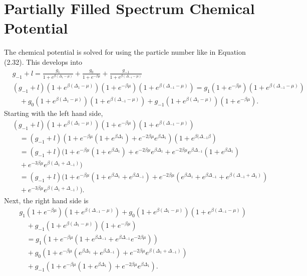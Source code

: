 \section{Partially Filled Spectrum Chemical Potential}
The chemical potential is solved for using the particle number like in Equation (2.32). This develops into  
\begin{align}
    &g_{-1}+l=\frac{g_1}{1+e^{\beta(\Delta_1-\mu)}}+\frac{g_0}{1+e^{-\beta\mu}}+\frac{g_{-1}}{1+e^{\beta(\Delta_{-1}-\mu)}}\\
    &(g_{-1}+l)(1+e^{\beta(\Delta_1-\mu)})(1+e^{-\beta\mu})(1+e^{\beta(\Delta_{-1}-\mu)})=g_1(1+e^{-\beta\mu})(1+e^{\beta(\Delta_{-1}-\mu)})\nonumber\\
    &\quad+g_0(1+e^{\beta(\Delta_1-\mu)})(1+e^{\beta(\Delta_{-1}-\mu)})+g_{-1}(1+e^{\beta(\Delta_1-\mu)})(1+e^{-\beta\mu}).
    \end{align}
Starting with the left hand side,
\begin{align}
    &(g_{-1}+l)(1+e^{\beta(\Delta_1-\mu)})(1+e^{-\beta\mu})(1+e^{\beta(\Delta_{-1}-\mu)})\nonumber\\
    &\quad=(g_{-1}+l)(1+e^{-\beta\mu}(1+e^{\beta\Delta_1})+e^{-2\beta\mu}e^{\beta\Delta_1})(1+e^{\beta(\Delta_{-1}\beta})\nonumber\\
    &\quad=(g_{-1}+l)(1+e^{-\beta\mu}(1+e^{\beta\Delta_1})+e^{-2\beta\mu}e^{\beta\Delta_1}+e^{-2\beta\mu}e^{\beta\Delta_{-1}}(1+e^{\beta\Delta_1})\nonumber\\
    &\quad+e^{-3\beta\mu}e^{\beta(\Delta_1+\Delta_{-1})})\nonumber\\
    &\quad=(g_{-1}+l)(1+e^{-\beta\mu}(1+e^{\beta\Delta_1}+e^{\beta\Delta_{-1}})+e^{-2\beta\mu}(e^{\beta\Delta_1}+e^{\beta\Delta_{-1}}+e^{\beta(\Delta_{-1}+\Delta_1)})\nonumber\\
    &\quad+e^{-3\beta\mu}e^{\beta(\Delta_1+\Delta_{-1})}).
\end{align}
Next, the right hand side is
\begin{align}
    &g_1(1+e^{-\beta\mu})(1+e^{\beta(\Delta_{-1}-\mu)})+g_0(1+e^{\beta(\Delta_1-\mu)})(1+e^{\beta(\Delta_{-1}-\mu)})\nonumber\\
    &\quad+g_{-1}(1+e^{\beta(\Delta_1-\mu)})(1+e^{-\beta\mu})\\
    &\quad=g_1(1+e^{-\beta\mu}(1+e^{\beta\Delta_{-1}}+e^{\beta\Delta_{-1}}e^{-2\beta\mu}))\nonumber\\
    &\quad+g_0(1+e^{-\beta\mu}(e^{\beta\Delta_1}+e^{\beta\Delta_{-1}})+e^{-2\beta\mu}e^{\beta(\Delta_1+\Delta_{-1})})\nonumber\\
    &\quad+g_{-1}(1+e^{-\beta\mu}(1+e^{\beta\Delta_1})+e^{-2\beta\mu}e^{\beta\Delta_1}).
\end{align}
